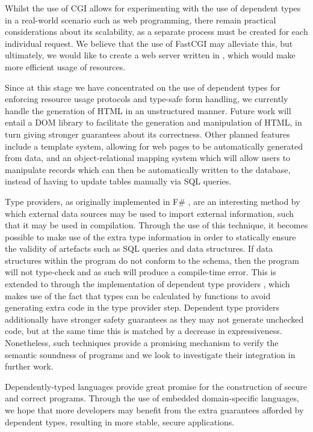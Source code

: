 \documentclass[preprint]{sigplanconf}
\begin{document}
Whilst the use of CGI allows for experimenting with the use of dependent types in a real-world scenario such as web programming, there remain practical considerations about its scalability, as a separate process must be created for each individual request. We believe that the use of FastCGI may alleviate this, but ultimately, we would like to create a web server written in \idris{}, which would make more efficient usage of resources. 

Since at this stage we have concentrated on the use of dependent types for enforcing resource usage protocols and type-safe form handling, we currently handle the generation of HTML in an unstructured manner. Future work will entail a DOM library to facilitate the generation and manipulation of HTML, in turn giving stronger guarantees about its correctness. Other planned features include a template system, allowing for web pages to be automatically generated from data, and an object-relational mapping system which will allow users to manipulate records which can then be automatically written to the database, instead of having to update tables manually via SQL queries.

Type providers, as originally implemented in F\# \cite{msr:tp}, are an interesting method by which external data sources may be used to import external information, such that it may be used in compilation. Through the use of this technique, it becomes possible to make use of the extra type information in order to statically ensure the validity of artefacts such as SQL queries and data structures. If data structures within the program do not conform to the schema, then the program will not type-check and as such will produce a compile-time error. This is extended to \idris{} through the implementation of dependent type providers \cite{christiansen:dtp}, which makes use of the fact that types can be calculated by functions to avoid generating extra code in the type provider step. Dependent type providers additionally have stronger safety guarantees as they may not generate unchecked code, but at the same time this is matched by a decrease in expressiveness. Nonetheless, such techniques provide a promising mechanism to verify the semantic soundness of programs and we look to investigate their integration in further work.

Dependently-typed languages provide great promise for the construction of secure and correct programs. Through the use of embedded domain-specific languages, we hope that more developers may benefit from the extra guarantees afforded by dependent types, resulting in more stable, secure applications.
\end{document}
